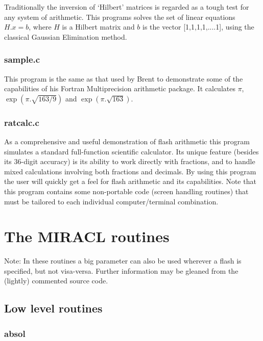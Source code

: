      Traditionally the inversion of `Hilbert' matrices is  regarded  as  a 
      tough test for any system of arithmetic. This programs solves the set 
      of linear equations $H.x = b$, where $H$ is a Hilbert matrix and $b$ is the 
      vector  [1,1,1,1,....1],  using  the  classical  Gaussian Elimination 
      method.  

      \subsection{sample.c}

      This program is the same as that used by Brent \cite{Brent78} to  demonstrate 
      some  of  the  capabilities  of his Fortran Multiprecision arithmetic 
      package. It calculates $\pi$, $\exp(\pi.\sqrt{163/9})$ and 
      $\exp(\pi.\sqrt{163})$.  


      \subsection{ratcalc.c}

      As a comprehensive and useful demonstration of flash arithmetic  this 
      program simulates a standard full-function scientific calculator. Its 
      unique feature (besides its 36-digit accuracy) is its ability to work
      directly with fractions, and to handle mixed  calculations  involving
      both fractions and decimals. By using  this  program  the  user  will
      quickly  get  a feel for flash arithmetic and its capabilities.  Note
      that this program contains some non-portable  code  (screen  handling
      routines) that must be tailored to each individual  computer/terminal
      combination.  


\cleardoublepage
\chapter{The MIRACL routines}


      Note: In these routines a big parameter can also be used wherever a 
            flash is specified, but not visa-versa. Further information may 
            be gleaned from the (lightly) commented source code.  

\section{Low level routines}

\subsection{absol}

